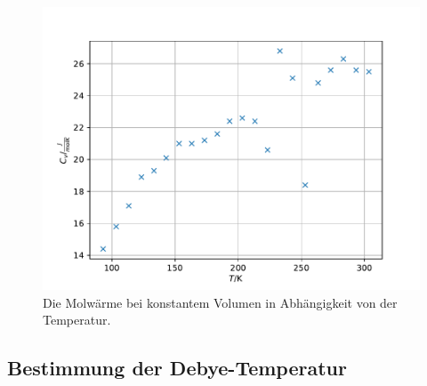 \begin{figure}
  \centering
  \includegraphics{cv.pdf}
  \caption{Die Molwärme bei konstantem Volumen in Abhängigkeit von der Temperatur.}
  \label{fig:cv}
\end{figure}
\FloatBarrier






\subsection{Bestimmung der Debye-Temperatur}

